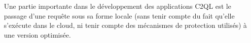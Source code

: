 Une partie importante dans le développement des
applications C2QL est le passage d'une requête
sous sa forme locale (sans tenir compte
du fait qu'elle s'exécute dans le cloud,
ni tenir compte des mécanismes de protection utilisés)
à une version optimisée.

